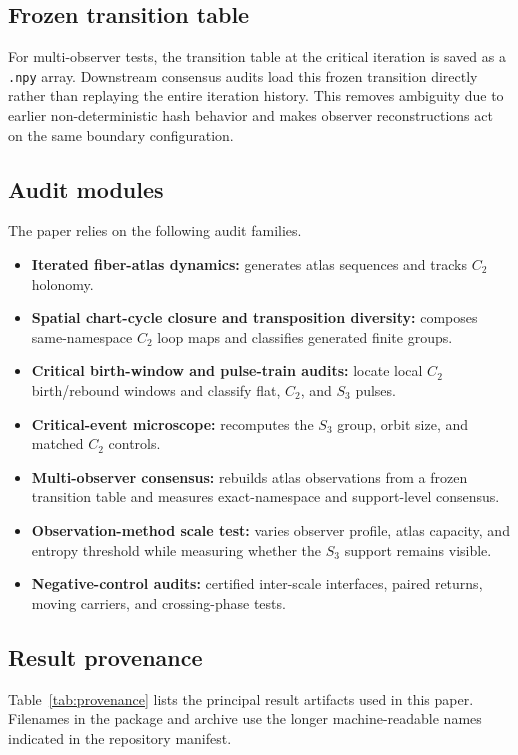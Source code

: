 \documentclass[11pt]{article}
\begin{document}
\subsection{Frozen transition table}

For multi-observer tests, the transition table at the critical iteration is saved as a \texttt{.npy} array.  Downstream consensus audits load this frozen transition directly rather than replaying the entire iteration history.  This removes ambiguity due to earlier non-deterministic hash behavior and makes observer reconstructions act on the same boundary configuration.

\subsection{Audit modules}

The paper relies on the following audit families.

\begin{itemize}
\item \textbf{Iterated fiber-atlas dynamics:} generates atlas sequences and tracks $C_2$ holonomy.
\item \textbf{Spatial chart-cycle closure and transposition diversity:} composes same-namespace $C_2$ loop maps and classifies generated finite groups.
\item \textbf{Critical birth-window and pulse-train audits:} locate local $C_2$ birth/rebound windows and classify flat, $C_2$, and $S_3$ pulses.
\item \textbf{Critical-event microscope:} recomputes the $S_3$ group, orbit size, and matched $C_2$ controls.
\item \textbf{Multi-observer consensus:} rebuilds atlas observations from a frozen transition table and measures exact-namespace and support-level consensus.
\item \textbf{Observation-method scale test:} varies observer profile, atlas capacity, and entropy threshold while measuring whether the $S_3$ support remains visible.
\item \textbf{Negative-control audits:} certified inter-scale interfaces, paired returns, moving carriers, and crossing-phase tests.
\end{itemize}

\subsection{Result provenance}

Table~\ref{tab:provenance} lists the principal result artifacts used in this paper.  Filenames in the package and archive use the longer machine-readable names indicated in the repository manifest.
\end{document}
